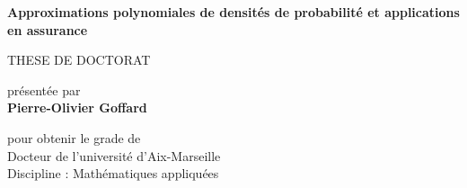 {\begin{titlepage}
\begin{flushleft}
\begin{center}
         \vspace{0.5cm}
        \Huge\color[rgb]{0,0,1} \bfseries Approximations polynomiales de densités de probabilité et applications en assurance
\vspace{0.5cm}
 \end{center}
    \begin{center}
		\LARGE THESE DE DOCTORAT
    \end{center}
	\vspace{0.5cm}
    \begin{center}
	\normalsize présentée par\\
        \huge\bfseries Pierre-Olivier Goffard
\vspace{0.5cm}
\end{center}
\begin{center}
	\normalsize pour obtenir le grade de \\
        \Large Docteur de l\rq{}université d\rq{}Aix-Marseille\\
\vspace{0.2cm}
\normalsize Discipline : Mathématiques appliquées


\end{center}
\end{flushleft}
\end{titlepage}}
